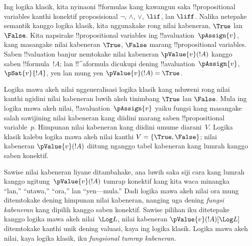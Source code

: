 \documentclass[../../../include/open-logic-section]{subfiles}
\begin{document}


Ing logika klasik, kita nyinaoni !!{formula}s kang kawangun saka
!!{propositional variable}s kanthi konektif proposisional
$\lnot$, $\land$, $\lor$, $\lif$, lan $\liff$. Nalika netepake
semantik kanggo logika klasik, kita nggunakake rong nilai kabeneran,
$\True$ lan $\False$. Kita napsirake !!{propositional variable}s ing
!!a{valuation}~$\pAssign{v}$, kang masangake nilai kabeneran
$\True$, $\False$ marang !!{propositional variable}s. Saben
!!{valuation} banjur nemtokake nilai kabeneran $\pValue{v}(!A)$
kanggo saben !!{formula}~$!A$; lan !!^a{formula} dicukupi dening
!!a{valuation}~$\pAssign{v}$, $\pSat{v}{!A}$, yen lan mung yen
$\pValue{v}(!A) = \True$.

Logika mawa akeh nilai nggeneralisasi logika klasik kang nduweni
rong nilai kanthi ngidini nilai kabeneran luwih akeh tinimbang
$\True$ lan $\False$. Mula ing logika mawa akeh nilai,
!!a{valuation}~$\pAssign{v}$ yaiku fungsi kang masangake
salah sawijining nilai kabeneran kang diidini marang saben
!!{propositional variable}~$p$. Himpunan nilai kabeneran kang
diidini umume diarani~$V$. Logika klasik kalebu logika mawa akeh
nilai kanthi $V = \{\True, \False\}$; nilai kabeneran
$\pValue{v}(!A)$ diitung nganggo tabel kabeneran kang lumrah
kanggo saben konektif.

Sawise nilai kabeneran liyane ditambahake, ana luwih saka siji
cara kang lumrah kanggo ngitung~$\pValue{v}(!A)$ tumrap konektif
kang kita waca minangka ``lan,'' ``utawa,'' ``ora,'' lan
``yen---mula.'' Dadi logika mawa akeh nilai ora mung ditemtokake
dening himpunan nilai kabeneran, nanging uga dening
\emph{fungsi kabeneran} kang dipilih kanggo saben konektif.
Sawise pilihan iku ditetepake kanggo logika mawa akeh nilai~$\Log L$,
nilai kabeneran $\pValue{v}(!A)[\Log L]$ ditemtokake kanthi unik
dening valuasi, kaya ing logika klasik. Logika mawa akeh nilai,
kaya logika klasik, iku \emph{fungsional tumrap kabeneran}.
\end{document}
